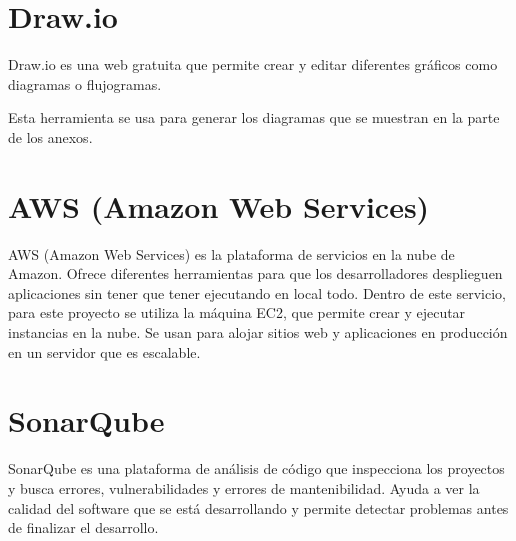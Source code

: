 \section{Draw.io}\label{drawio}

Draw.io es una web gratuita que permite crear y editar diferentes gráficos como diagramas o flujogramas. 

Esta herramienta se usa para generar los diagramas que se muestran en la parte de los anexos.


\section{AWS (Amazon Web Services)}\label{aws}
AWS (Amazon Web Services) es la plataforma de servicios en la nube de Amazon. Ofrece diferentes herramientas para que los desarrolladores desplieguen aplicaciones sin tener que tener ejecutando en local todo. Dentro de este servicio, para este proyecto se utiliza la máquina EC2, que permite crear y ejecutar instancias en la nube. Se usan para alojar sitios web y aplicaciones en producción en un servidor que es escalable.


\section{SonarQube}\label{sonarqube}
SonarQube es una plataforma de análisis de código que inspecciona los proyectos y busca errores, vulnerabilidades y errores de mantenibilidad. Ayuda a ver la calidad del software que se está desarrollando y permite detectar problemas antes de finalizar el desarrollo.

